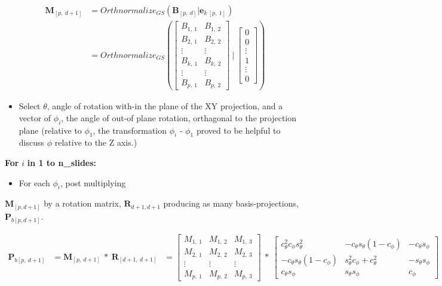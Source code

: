 \documentclass{monashthesis}
\begin{document}
\begin{align*}
  \textbf{M}_{[p,~d+1]}
    &= Orthnormalize_{GS}( \textbf{B}_{[p,~d]}|\textbf{e}_{k~[p,~1]} ) \\
    &= Orthnormalize_{GS}
    \left(
      \begin{bmatrix}
        B_{1,~1} & B_{1,~2}\\
        B_{2,~1} & B_{2,~2}\\
        \vdots   & \vdots  \\
        B_{k,~1} & B_{k,~2}\\
        \vdots   & \vdots  \\
        B_{p,~1} & B_{p,~2}
      \end{bmatrix}
    ~|~
      \begin{bmatrix}
      0 \\
      0 \\
      \vdots \\
      1 \\
      \vdots \\
      0
      \end{bmatrix}
    \right)
\end{align*}

\begin{itemize}
\tightlist
\item
  Select \(\theta\), angle of rotation with-in the plane of the XY
  projection, and a vector of \(\phi_i\), the angle of out-of plane
  rotation, orthagonal to the projection plane (relative to \(\phi_1\),
  the transformation \(\phi_i\) - \(\phi_1\) proved to be helpful to
  discuss \(\phi\) relative to the Z axis.)
\end{itemize}

\textbf{For } \(i\) \textbf{in 1 to n\_slides:}

\begin{itemize}
\tightlist
\item
  For each \(\phi_i\), post multiplying
\end{itemize}

\(\textbf{M}_{[p, d+1]}\) by a rotation matrix,
\(\textbf{R}_{d+1, d+1}\) producing as many basis-projections,
\(\textbf{P}_{b[p, d+1]}\).

\begin{align}
  \textbf{P}_{b[p,~d+1]}
    &= \textbf{M}_{[p,~d+1]} ~*~ \textbf{R}_{[d+1,~d+1]}
    &= \begin{bmatrix}
        M_{1,~1} & M_{1,~2} & M_{1,~3} \\
        M_{2,~1} & M_{2,~2} & M_{2,~3} \\
        \vdots   & \vdots   & \vdots   \\
        M_{p,~1} & M_{p,~2} & M_{p,~3}
    \end{bmatrix}
      ~*~
    \begin{bmatrix}
      c_\theta^2 c_\phi s_\theta^2 &
      -c_\theta s_\theta (1 - c_\phi) &
      -c_\theta s_\phi \\
      -c_\theta s_\theta (1 - c_\phi) &
      s_\theta^2 c_\phi + c_\theta^2 &
      -s_\theta s_\phi \\
      c_\theta s_\phi &
      s_\theta s_\phi &
      c_\phi
    \end{bmatrix}
\end{align}
\end{document}
